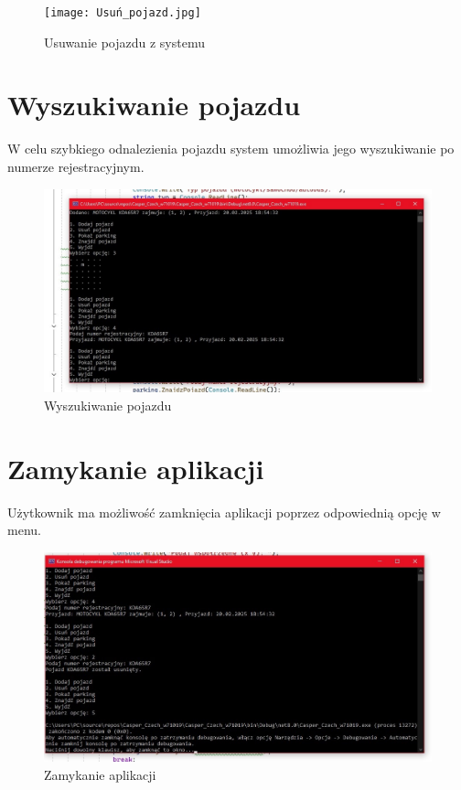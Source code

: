 \begin{figure}[H]
    \centering
    \texttt{[image: Usuń\_pojazd.jpg]}
    \caption{Usuwanie pojazdu z systemu}
\end{figure}

\section{Wyszukiwanie pojazdu}
W celu szybkiego odnalezienia pojazdu system umożliwia jego wyszukiwanie po numerze rejestracyjnym. 

\begin{figure}[H]
    \centering
    \includegraphics[width=0.8\linewidth]{Znajdz_pojazd.jpg}
    \caption{Wyszukiwanie pojazdu}
\end{figure}

\section{Zamykanie aplikacji}
Użytkownik ma możliwość zamknięcia aplikacji poprzez odpowiednią opcję w menu.

\begin{figure}[H]
    \centering
    \includegraphics[width=0.8\linewidth]{Wyjdz.jpg}
    \caption{Zamykanie aplikacji}
\end{figure}





